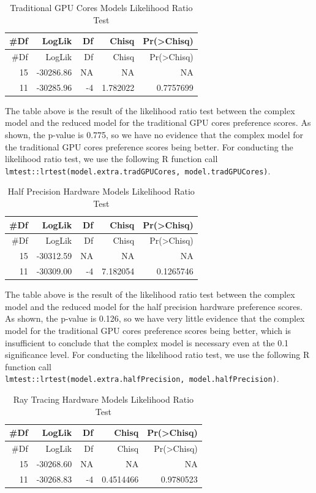 \documentclass[
]{article}
\begin{document}
\begin{longtable}[]{@{}rrrrr@{}}
\caption{Traditional GPU Cores Models Likelihood Ratio
Test}\tabularnewline
\toprule()
\#Df & LogLik & Df & Chisq & Pr(\textgreater Chisq) \\
\midrule()
\endfirsthead
\toprule()
\#Df & LogLik & Df & Chisq & Pr(\textgreater Chisq) \\
\midrule()
\endhead
15 & -30286.86 & NA & NA & NA \\
11 & -30285.96 & -4 & 1.782022 & 0.7757699 \\
\bottomrule()
\end{longtable}

The table above is the result of the likelihood ratio test between the
complex model and the reduced model for the traditional GPU cores
preference scores. As shown, the p-value is 0.775, so we have no
evidence that the complex model for the traditional GPU cores preference
scores being better. For conducting the likelihood ratio test, we use
the following R function call
\texttt{lmtest::lrtest(model.extra.tradGPUCores,\ model.tradGPUCores)}.

\begin{longtable}[]{@{}rrrrr@{}}
\caption{Half Precision Hardware Models Likelihood Ratio
Test}\tabularnewline
\toprule()
\#Df & LogLik & Df & Chisq & Pr(\textgreater Chisq) \\
\midrule()
\endfirsthead
\toprule()
\#Df & LogLik & Df & Chisq & Pr(\textgreater Chisq) \\
\midrule()
\endhead
15 & -30312.59 & NA & NA & NA \\
11 & -30309.00 & -4 & 7.182054 & 0.1265746 \\
\bottomrule()
\end{longtable}

The table above is the result of the likelihood ratio test between the
complex model and the reduced model for the half precision hardware
preference scores. As shown, the p-value is 0.126, so we have very
little evidence that the complex model for the traditional GPU cores
preference scores being better, which is insufficient to conclude that
the complex model is necessary even at the 0.1 significance level. For
conducting the likelihood ratio test, we use the following R function
call
\texttt{lmtest::lrtest(model.extra.halfPrecision,\ model.halfPrecision)}.

\begin{longtable}[]{@{}rrrrr@{}}
\caption{Ray Tracing Hardware Models Likelihood Ratio
Test}\tabularnewline
\toprule()
\#Df & LogLik & Df & Chisq & Pr(\textgreater Chisq) \\
\midrule()
\endfirsthead
\toprule()
\#Df & LogLik & Df & Chisq & Pr(\textgreater Chisq) \\
\midrule()
\endhead
15 & -30268.60 & NA & NA & NA \\
11 & -30268.83 & -4 & 0.4514466 & 0.9780523 \\
\bottomrule()
\end{longtable}
\end{document}
